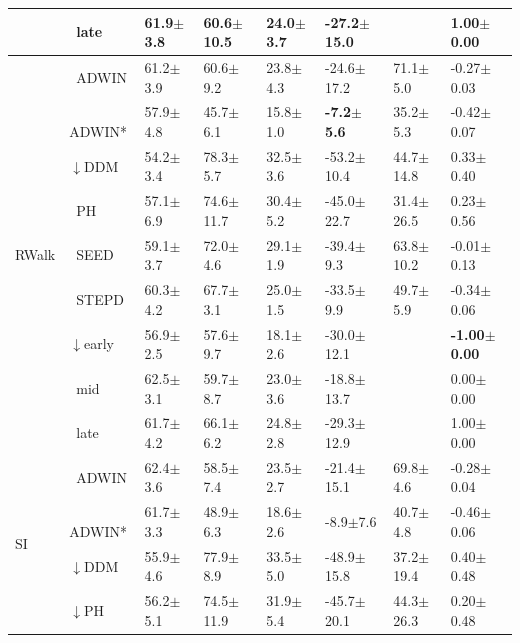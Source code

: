 \begin{tabular}{llllllll}
 & $\ \;$late & 61.9\tiny{$\pm$3.8} & 60.6\tiny{$\pm$10.5} & 24.0\tiny{$\pm$3.7} & -27.2\tiny{$\pm$15.0} &  & 1.00\tiny{$\pm$0.00} \\
\midrule
\multirow[t]{9}{*}{RWalk} & $\ \;$ADWIN & 61.2\tiny{$\pm$3.9} & 60.6\tiny{$\pm$9.2} & 23.8\tiny{$\pm$4.3} & -24.6\tiny{$\pm$17.2} & 71.1\tiny{$\pm$5.0} & -0.27\tiny{$\pm$0.03} \\
 & $\ \;$ADWIN* & 57.9\tiny{$\pm$4.8} & 45.7\tiny{$\pm$6.1} & 15.8\tiny{$\pm$1.0} & \textbf{-7.2\tiny{$\pm$5.6}} & 35.2\tiny{$\pm$5.3} & -0.42\tiny{$\pm$0.07} \\
 & $\downarrow$DDM & 54.2\tiny{$\pm$3.4} & 78.3\tiny{$\pm$5.7} & 32.5\tiny{$\pm$3.6} & -53.2\tiny{$\pm$10.4} & 44.7\tiny{$\pm$14.8} & 0.33\tiny{$\pm$0.40} \\
 & $\ \;$PH & 57.1\tiny{$\pm$6.9} & 74.6\tiny{$\pm$11.7} & 30.4\tiny{$\pm$5.2} & -45.0\tiny{$\pm$22.7} & 31.4\tiny{$\pm$26.5} & 0.23\tiny{$\pm$0.56} \\
 & $\ \;$SEED & 59.1\tiny{$\pm$3.7} & 72.0\tiny{$\pm$4.6} & 29.1\tiny{$\pm$1.9} & -39.4\tiny{$\pm$9.3} & 63.8\tiny{$\pm$10.2} & -0.01\tiny{$\pm$0.13} \\
 & $\ \;$STEPD & 60.3\tiny{$\pm$4.2} & 67.7\tiny{$\pm$3.1} & 25.0\tiny{$\pm$1.5} & -33.5\tiny{$\pm$9.9} & 49.7\tiny{$\pm$5.9} & -0.34\tiny{$\pm$0.06} \\
 & $\downarrow$early & 56.9\tiny{$\pm$2.5} & 57.6\tiny{$\pm$9.7} & 18.1\tiny{$\pm$2.6} & -30.0\tiny{$\pm$12.1} &  & \textbf{-1.00\tiny{$\pm$0.00}} \\
 & $\ \;$mid & 62.5\tiny{$\pm$3.1} & 59.7\tiny{$\pm$8.7} & 23.0\tiny{$\pm$3.6} & -18.8\tiny{$\pm$13.7} &  & 0.00\tiny{$\pm$0.00} \\
 & $\ \;$late & 61.7\tiny{$\pm$4.2} & 66.1\tiny{$\pm$6.2} & 24.8\tiny{$\pm$2.8} & -29.3\tiny{$\pm$12.9} &  & 1.00\tiny{$\pm$0.00} \\
\midrule
\multirow[t]{9}{*}{SI} & $\ \;$ADWIN & 62.4\tiny{$\pm$3.6} & 58.5\tiny{$\pm$7.4} & 23.5\tiny{$\pm$2.7} & -21.4\tiny{$\pm$15.1} & 69.8\tiny{$\pm$4.6} & -0.28\tiny{$\pm$0.04} \\
 & $\ \;$ADWIN* & 61.7\tiny{$\pm$3.3} & 48.9\tiny{$\pm$6.3} & 18.6\tiny{$\pm$2.6} & -8.9\tiny{$\pm$7.6} & 40.7\tiny{$\pm$4.8} & -0.46\tiny{$\pm$0.06} \\
 & $\downarrow$DDM & 55.9\tiny{$\pm$4.6} & 77.9\tiny{$\pm$8.9} & 33.5\tiny{$\pm$5.0} & -48.9\tiny{$\pm$15.8} & 37.2\tiny{$\pm$19.4} & 0.40\tiny{$\pm$0.48} \\
 & $\downarrow$PH & 56.2\tiny{$\pm$5.1} & 74.5\tiny{$\pm$11.9} & 31.9\tiny{$\pm$5.4} & -45.7\tiny{$\pm$20.1} & 44.3\tiny{$\pm$26.3} & 0.20\tiny{$\pm$0.48} \\

\end{tabular}
